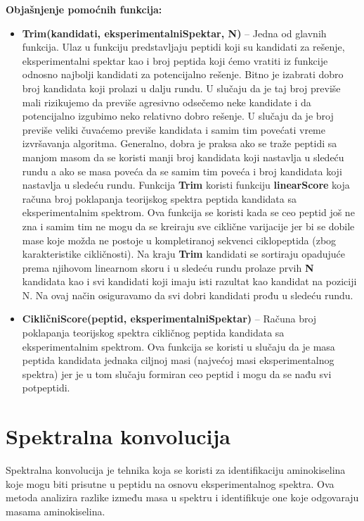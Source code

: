 \documentclass[12pt,oneside]{memoir}
\begin{document}
\noindent
\textbf{Objašnjenje pomoćnih funkcija:}
\begin{itemize}
    \item \textbf{Trim(kandidati, eksperimentalniSpektar, N)} – Jedna od glavnih funkcija. Ulaz u funkciju predstavljaju peptidi koji su kandidati za rešenje, eksperimentalni spektar kao i broj peptida koji ćemo vratiti iz funkcije odnosno najbolji kandidati za potencijalno rešenje. Bitno je izabrati dobro broj kandidata koji prolazi u dalju rundu. U slučaju da je taj broj previše mali rizikujemo da previše agresivno odsečemo neke kandidate i da potencijalno izgubimo neko relativno dobro rešenje. U slučaju da je broj previše veliki čuvaćemo previše kandidata i samim tim povećati vreme izvršavanja algoritma. Generalno, dobra je praksa ako se traže peptidi sa manjom masom da se koristi manji broj kandidata koji nastavlja u sledeću rundu a ako se masa poveća da se samim tim poveća i broj kandidata koji nastavlja u sledeću rundu. Funkcija \textbf{Trim} koristi funkciju \textbf{linearScore} koja računa broj poklapanja teorijskog spektra peptida kandidata sa eksperimentalnim spektrom. Ova funkcija se koristi kada se ceo peptid još ne zna i samim tim ne mogu da se kreiraju sve ciklične varijacije jer bi se dobile mase koje možda ne postoje u kompletiranoj sekvenci ciklopeptida (zbog karakteristike cikličnosti). Na kraju \textbf{Trim} kandidati se sortiraju opadujuće prema njihovom linearnom skoru i u sledeću rundu prolaze prvih \textbf{N} kandidata kao i svi kandidati koji imaju isti razultat kao kandidat na poziciji N. Na ovaj način osiguravamo da svi dobri kandidati prođu u sledeću rundu.
    \item \textbf{CikličniScore(peptid, eksperimentalniSpektar)} – Računa broj poklapanja teorijskog spektra cikličnog peptida kandidata sa eksperimentalnim spektrom. Ova funkcija se koristi u slučaju da je masa peptida kandidata jednaka ciljnoj masi (najvećoj masi eksperimentalnog spektra) jer je u tom slučaju formiran ceo peptid i mogu da se nađu svi potpeptidi.
\end{itemize}

\section{Spektralna konvolucija}

Spektralna konvolucija \cite{online_lecture, online_book} je tehnika koja se koristi za identifikaciju aminokiselina koje mogu biti prisutne u peptidu na osnovu eksperimentalnog spektra. Ova metoda analizira razlike između masa u spektru i identifikuje one koje odgovaraju masama aminokiselina.
\end{document}
